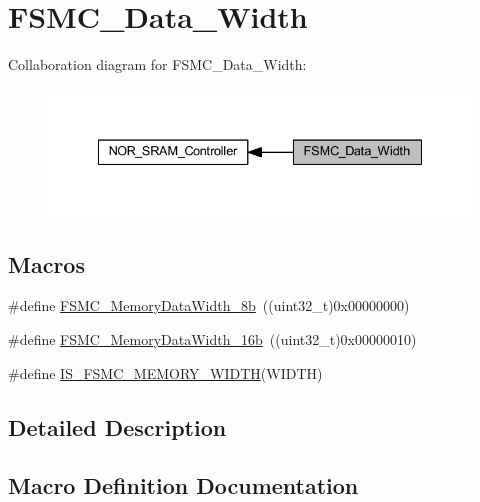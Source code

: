 \hypertarget{group___f_s_m_c___data___width}{}\section{F\+S\+M\+C\+\_\+\+Data\+\_\+\+Width}
\label{group___f_s_m_c___data___width}
Collaboration diagram for F\+S\+M\+C\+\_\+\+Data\+\_\+\+Width\+:
\nopagebreak
\begin{figure}[H]
\begin{center}
\leavevmode
\includegraphics[width=335pt]{group___f_s_m_c___data___width}
\end{center}
\end{figure}
\subsection*{Macros}
\begin{DoxyCompactItemize}
\item 
\#define \hyperlink{group___f_s_m_c___data___width_ga5753e089830f19af70a724766e3c329f}{F\+S\+M\+C\+\_\+\+Memory\+Data\+Width\+\_\+8b}~((uint32\+\_\+t)0x00000000)
\item 
\#define \hyperlink{group___f_s_m_c___data___width_ga65d85c3072e6790ae760ca2248e46df6}{F\+S\+M\+C\+\_\+\+Memory\+Data\+Width\+\_\+16b}~((uint32\+\_\+t)0x00000010)
\item 
\#define \hyperlink{group___f_s_m_c___data___width_ga003d52b62f5950fb041f73f15ce20171}{I\+S\+\_\+\+F\+S\+M\+C\+\_\+\+M\+E\+M\+O\+R\+Y\+\_\+\+W\+I\+D\+TH}(W\+I\+D\+TH)
\end{DoxyCompactItemize}


\subsection{Detailed Description}


\subsection{Macro Definition Documentation}
\mbox{\label{group___f_s_m_c___data___width_ga65d85c3072e6790ae760ca2248e46df6}} 
